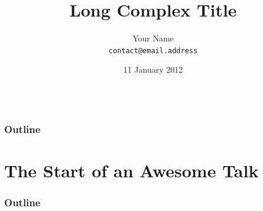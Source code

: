 \documentclass{beamer}
\title[Abbrv. Title]{Long Complex Title}
\author{Your Name \\ \texttt{contact@email.address}}
\date{11 January 2012}
\begin{document}
{

  \begin{frame}[plain]

    \begin{columns}

      \begin{column}[l]{5cm}
      \end{column}

      \begin{column}[r]{5cm}
        \titlepage
      \end{column}

    \end{columns}
  \end{frame}
}

\begin{frame}
\frametitle{Outline}
\tableofcontents
\end{frame}

\section{The Start of an Awesome Talk}

\begin{frame}
\frametitle{Outline}
\tableofcontents[currentsection]
\end{frame}
\end{document}
